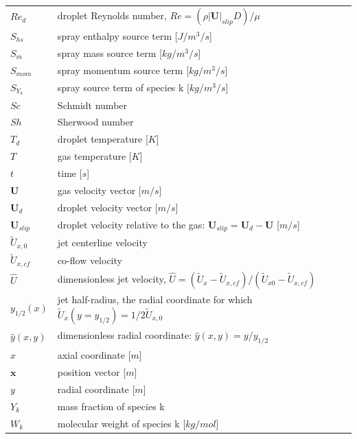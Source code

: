 \documentclass[preprint,12pt,review]{elsarticle}
\newcommand{\bv}[1]{\mathbf{#1}}
\begin{document}
\begin{tabular}{ll}
$Re_d$ & droplet Reynolds number, $Re=(\rho |\bv{U}|_{slip} D) /\mu$ \\
$S_{hs}$ & spray enthalpy source term [$J/m^3/s$]\\
$S_{m}$ & spray mass source term [$kg/m^3/s$]\\
$S_{mom}$ & spray momentum source term [$kg/m^3/s$]\\
$S_{Y_k}$ & spray source term of species k [$kg/m^3/s$]\\
$Sc$ & Schmidt number \\
$Sh$ & Sherwood number \\
$T_d$ & droplet temperature [$K$]\\
$T$ & gas temperature [$K$]\\
$t$ & time [$s$]\\
$\bv{U}$ & gas velocity vector [$m/s$]\\
$\bv{U}_d$ & droplet velocity vector [$m/s$]\\
$\bv{U}_{slip}$ & droplet velocity relative to the gas: $\bv{U}_{slip}=\bv{U}_d -\bv{U}$  [$m/s$]\\
$\tilde{U}_{x,0}$ & jet centerline velocity \\
$\tilde{U}_{x,cf}$ & co-flow velocity \\
$\hat{U}$ & dimensionless jet velocity, $\hat{U} = (\tilde{U}_x-\tilde{U}_{x,cf})/(\tilde{U}_{x0}-\tilde{U}_{x,cf})$ \\
$y_{1/2}(x)$ & jet half-radius, the radial coordinate for which $\tilde{U}_x (y=y_{1/2}) = 1/2\tilde{U}_{x,0}$\\
$\hat{y}(x,y)$ & dimensionless radial coordinate: $\hat{y}(x,y)=y/y_{1/2}$ \\
$x$ & axial coordinate [$m$]\\
$\bv{x}$ & position vector [$m$] \\
$y$ & radial coordinate [$m$]\\
$Y_k$ & mass fraction of species k\\
$W_k$ & molecular weight of species k [$kg/mol$]\\
\end{tabular}

\vspace{25pt}
\end{document}
